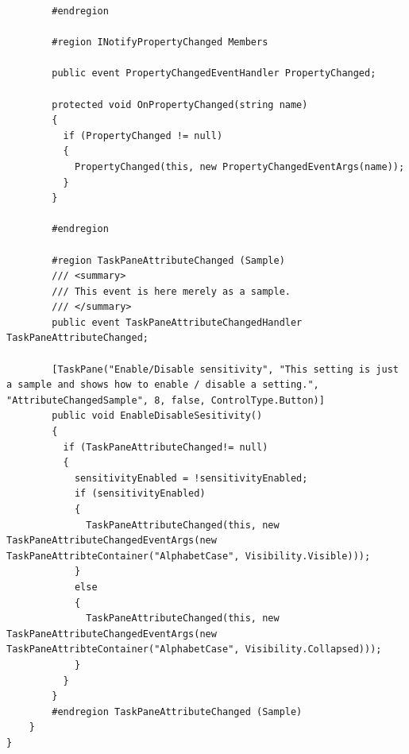 \begin{lstlisting}
        #endregion

        #region INotifyPropertyChanged Members

        public event PropertyChangedEventHandler PropertyChanged;

        protected void OnPropertyChanged(string name)
        {
          if (PropertyChanged != null)
          {
            PropertyChanged(this, new PropertyChangedEventArgs(name));
          }
        }

        #endregion

        #region TaskPaneAttributeChanged (Sample)
        /// <summary>
        /// This event is here merely as a sample.
        /// </summary>
        public event TaskPaneAttributeChangedHandler TaskPaneAttributeChanged;

        [TaskPane("Enable/Disable sensitivity", "This setting is just a sample and shows how to enable / disable a setting.", "AttributeChangedSample", 8, false, ControlType.Button)]
        public void EnableDisableSesitivity()
        {
          if (TaskPaneAttributeChanged!= null)
          {
            sensitivityEnabled = !sensitivityEnabled;
            if (sensitivityEnabled)
            {
              TaskPaneAttributeChanged(this, new TaskPaneAttributeChangedEventArgs(new TaskPaneAttribteContainer("AlphabetCase", Visibility.Visible)));
            }
            else
            {
              TaskPaneAttributeChanged(this, new TaskPaneAttributeChangedEventArgs(new TaskPaneAttribteContainer("AlphabetCase", Visibility.Collapsed)));
            }
          }
        }
        #endregion TaskPaneAttributeChanged (Sample)
    }
}
\end{lstlisting}